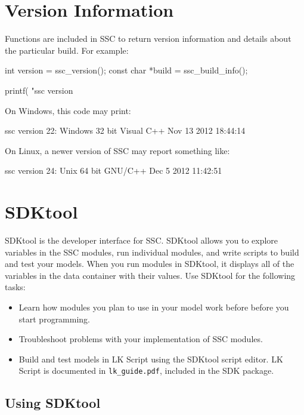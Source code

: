 \documentclass{scrartcl} %
\begin{document}
\section{Version Information}

Functions are included in SSC to return version information and details about the particular build.  For example:

\begin{verbatimtab}[4]
int version = ssc_version();
const char *build = ssc_build_info();

printf( "ssc version %
\end{verbatimtab}

On Windows, this code may print:

\begin{verbatimtab}[4]
	ssc version 22: Windows 32 bit Visual C++ Nov 13 2012 18:44:14
\end{verbatimtab}

On Linux, a newer version of SSC may report something like:
\begin{verbatimtab}[4]
	ssc version 24: Unix 64 bit GNU/C++ Dec  5 2012 11:42:51
\end{verbatimtab}

\section{SDKtool}
\label{sec_sdktool}

SDKtool is the developer interface for SSC.  SDKtool allows you to explore variables in the SSC modules, run individual modules, and write scripts to build and test your models. When you run modules in SDKtool, it displays all of the variables in the data container with their values. Use SDKtool for the following tasks:

\begin{itemize}
\item Learn how modules you plan to use in your model work before before you start programming.
\item Troubleshoot problems with your implementation of SSC modules.
\item Build and test models in LK Script using the SDKtool script editor. LK Script is documented in \texttt{lk\_guide.pdf}, included in the SDK package.
\end{itemize}

\subsection{Using SDKtool}
\label{sec_sdktool_run}
\end{document}
